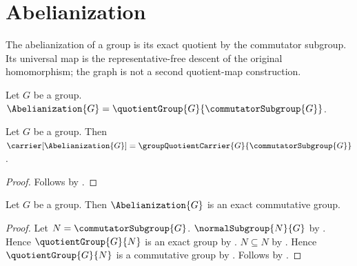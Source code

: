 


\section{Abelianization}

The abelianization of a group is its exact quotient by the commutator
subgroup.  Its universal map is the representative-free descent of the
original homomorphism; the graph is not a second quotient-map construction.

\begin{definition}\label{abelianization}
    Let $G$ be a group.
    $\Abelianization{G}=\quotientGroup{G}{\commutatorSubgroup{G}}$.
\end{definition}

\begin{proposition}\label{abelianization_carrier}
    Let $G$ be a group.
    Then $\carrier[\Abelianization{G}]=
        \groupQuotientCarrier{G}{\commutatorSubgroup{G}}$.
\end{proposition}
\begin{proof}
    Follows by .
\end{proof}

\begin{theorem}\label{abelianization_is_exact_commutative_group}
    Let $G$ be a group.
    Then $\Abelianization{G}$ is an exact commutative group.
\end{theorem}
\begin{proof}
    Let $N=\commutatorSubgroup{G}$.
    $\normalSubgroup{N}{G}$ by .
    Hence $\quotientGroup{G}{N}$ is an exact group by
        .
    $N\subseteq N$ by .
    Hence $\quotientGroup{G}{N}$ is a commutative group by
        .
    Follows by .
\end{proof}

